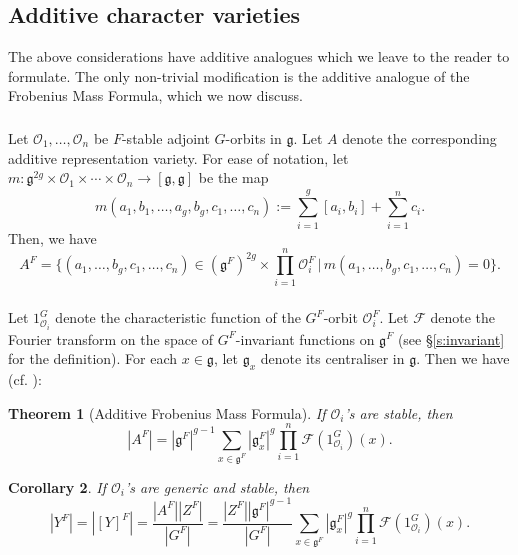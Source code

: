 \documentclass[12pt]{amsart}
\theoremstyle{plain}
\newtheorem{thm}{Theorem}
\newtheorem{cor}[thm]{Corollary}
\theoremstyle{definition}
\theoremstyle{remark}
\newcommand{\bA}{{A}}
\newcommand{\cO}{\mathcal{O}}
\newcommand{\fg}{\mathfrak{g}}
\begin{document}
\subsection{Additive character varieties} \label{ss:additive} 
The above considerations have additive analogues which we leave to the reader to formulate. The only non-trivial modification is the additive analogue of the Frobenius Mass Formula, which we now discuss. 

\subsubsection{} Let $\cO_1,\ldots,\cO_n$ be $F$-stable adjoint $G$-orbits in $\fg$. Let $A$ denote the corresponding additive representation variety. For ease of notation, let $m\colon \fg^{2g}\times \cO_1\times \cdots \times \cO_n\rightarrow [\fg,\fg]$ be the map
\[
m(a_1,b_1,\ldots,a_g, b_g, c_1,\ldots,c_n):=\sum_{i=1}^g [a_i,b_i] +\sum_{i=1}^n c_i. 
\]
Then, we have
\[
\bA^F=\Big\{(a_1,\ldots, b_g, c_1,\ldots,c_n)\in (\fg^F)^{2g}\times \prod_{i=1}^n \cO_i^F\, \Big|\, m(a_1,\ldots,b_g, c_1,\ldots,c_n)=0\Big\}.
\]






 \subsubsection{} Let $1_{\cO_i}^G$ denote the characteristic function of the $G^F$-orbit $\cO_i^F$. Let $ \mathcal{F}$ denote the Fourier transform on the space of $G^F$-invariant functions on $\fg^F$ (see \S \ref{s:invariant} for the definition).  For each $x\in \fg$, let $\fg_x$ denote its centraliser in $\fg$.  Then we have (cf. \cite[\S 3]{HLRV11}): 



\begin{thm}[Additive Frobenius Mass Formula] \label{t:additiveFrob} If $\cO_i$'s are stable, then 
\[
{|\bA^F|} = |\fg^F|^{g-1} \sum_{x\in \fg^F} |\fg_x^F|^g \prod_{i=1}^n \mathcal{F}(1_{\cO_i}^G)(x).
\] 
\end{thm} 


\begin{cor} \label{c:countY} 
If $\cO_i$'s are generic and stable, then
\[
|Y^F|=|[Y]^F|=\frac{|\bA^F||Z^F|}{|G^F|}=\frac{|Z^F||\fg^F|^{g-1}}{|G^F|} \sum_{x\in \fg^F} |\fg_x^F|^g \prod_{i=1}^n \mathcal{F}(1_{\cO_i}^G)(x).
\]
\end{cor} 
\end{document}
